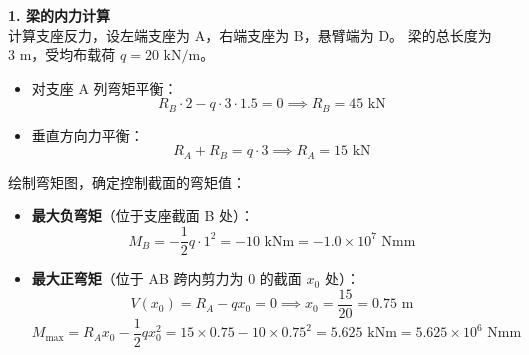 \documentclass[11pt,a4paper]{ctexrep}
\begin{document}
{\textbf{1. 梁的内力计算} \\
计算支座反力，设左端支座为 A，右端支座为 B，悬臂端为 D。
梁的总长度为 $3\text{ m}$，受均布载荷 $q = 20\text{ kN/m}$。
\begin{itemize}
    \item 对支座 A 列弯矩平衡：
          \[
              R_B \cdot 2 - q \cdot 3 \cdot 1.5 = 0 \implies R_B = 45\text{ kN}
          \]
    \item 垂直方向力平衡：
          \[
              R_A + R_B = q \cdot 3 \implies R_A = 15\text{ kN}
          \]
\end{itemize}
绘制弯矩图，确定控制截面的弯矩值：
\begin{itemize}
    \item \textbf{最大负弯矩}（位于支座截面 B 处）：
          \[
              M_B = -\frac{1}{2} q \cdot 1^2 = -10\text{ kNm} = -1.0 \times 10^7\text{ Nmm}
          \]
    \item \textbf{最大正弯矩}（位于 AB 跨内剪力为 0 的截面 $x_0$ 处）：
          \[
              V(x_0) = R_A - q x_0 = 0 \implies x_0 = \frac{15}{20} = 0.75\text{ m}
          \]
          \[
              M_{\max} = R_A x_0 - \frac{1}{2} q x_0^2 = 15 \times 0.75 - 10 \times 0.75^2 = 5.625\text{ kNm} = 5.625 \times 10^6\text{ Nmm}
          \]
\end{itemize}

}
\end{document}
